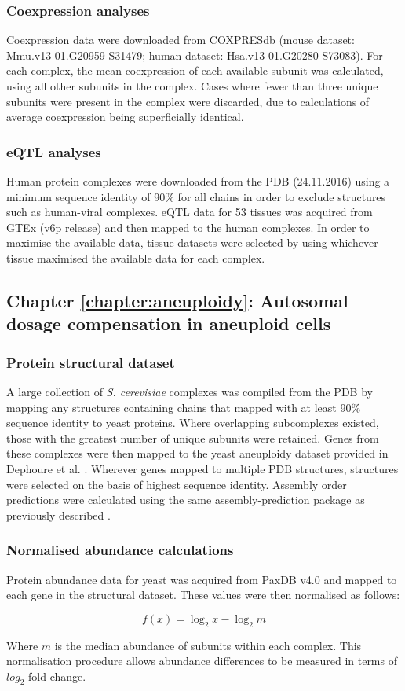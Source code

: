 \documentclass[a4paper,11pt,twoside,openright]{scrbook}
\begin{document}
\subsubsection{Coexpression analyses}
Coexpression data were downloaded from COXPRESdb \cite{Okamura2014} (mouse dataset: Mmu.v13-01.G20959-S31479; human dataset: Hsa.v13-01.G20280-S73083). For each complex, the mean coexpression of each available subunit was calculated, using all other subunits in the complex. Cases where fewer than three unique subunits were present in the complex were discarded, due to calculations of average coexpression being superficially identical.

\subsubsection{eQTL analyses}
Human protein complexes were downloaded from the PDB (24.11.2016) using a minimum sequence identity of 90\% for all chains in order to exclude structures such as human-viral complexes. eQTL data for 53 tissues was acquired from GTEx (v6p release) and then mapped to the human complexes. In order to maximise the available data, tissue datasets were selected by using whichever tissue maximised the available data for each complex.

\subsection{Chapter \ref*{chapter:aneuploidy}: Autosomal dosage compensation in aneuploid cells}
\subsubsection{Protein structural dataset}
A large collection of \textit{S. cerevisiae} complexes was compiled from the PDB by mapping any structures containing chains that mapped with at least 90\% sequence identity to yeast proteins. Where overlapping subcomplexes existed, those with the greatest number of unique subunits were retained. Genes from these complexes were then mapped to the yeast aneuploidy dataset provided in Dephoure et al. \cite{Dephoure2014}. Wherever genes mapped to multiple PDB structures, structures were selected on the basis of highest sequence identity. Assembly order predictions were calculated using the same assembly-prediction package as previously described \cite{Wells2016}.

\subsubsection{Normalised abundance calculations}
Protein abundance data for yeast was acquired from PaxDB v4.0 \cite{Wang2015} and mapped to each gene in the structural dataset. These values were then normalised as follows:

\begin{displaymath}
    f(x) = \log_2 x - \log_2 m
\end{displaymath}

Where $m$ is the median abundance of subunits within each complex. This normalisation procedure allows abundance differences to be measured in terms of $log_{2}$ fold-change.
\end{document}
